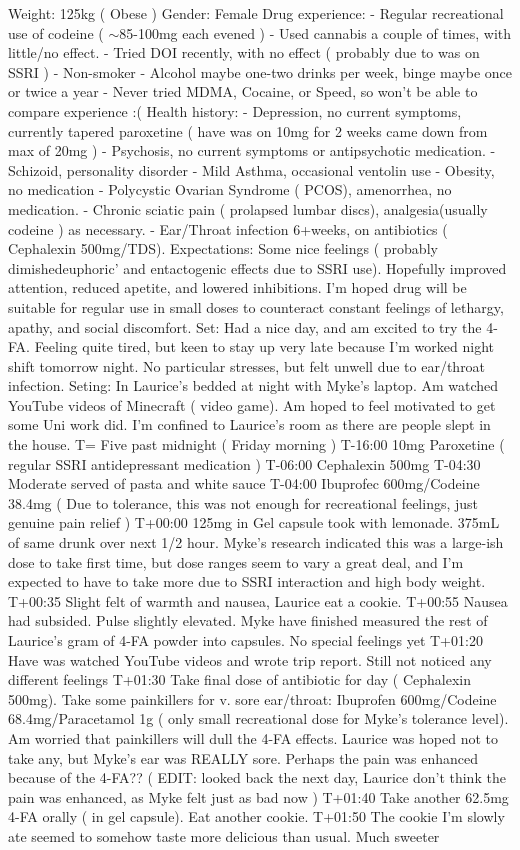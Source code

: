 \documentclass[12pt]{book}
\begin{document}
Weight: 125kg ( Obese ) Gender: Female Drug experience: - Regular recreational use of codeine ( $\sim$85-100mg each evened ) - Used cannabis a couple of times, with little/no effect. - Tried DOI recently, with no effect ( probably due to was on SSRI ) - Non-smoker - Alcohol maybe one-two drinks per week, binge maybe once or twice a year - Never tried MDMA, Cocaine, or Speed, so won't be able to compare experience :( Health history: - Depression, no current symptoms, currently tapered paroxetine ( have was on 10mg for 2 weeks came down from max of 20mg ) - Psychosis, no current symptoms or antipsychotic medication. - Schizoid, personality disorder - Mild Asthma, occasional ventolin use - Obesity, no medication - Polycystic Ovarian Syndrome ( PCOS), amenorrhea, no medication. - Chronic sciatic pain ( prolapsed lumbar discs), analgesia(usually codeine ) as necessary. - Ear/Throat infection 6+weeks, on antibiotics ( Cephalexin 500mg/TDS). Expectations: Some nice feelings ( probably dimishedeuphoric' and entactogenic effects due to SSRI use). Hopefully improved attention, reduced apetite, and lowered inhibitions. I'm hoped drug will be suitable for regular use in small doses to counteract constant feelings of lethargy, apathy, and social discomfort. Set: Had a nice day, and am excited to try the 4-FA. Feeling quite tired, but keen to stay up very late because I'm worked night shift tomorrow night. No particular stresses, but felt unwell due to ear/throat infection. Seting: In Laurice's bedded at night with Myke's laptop. Am watched YouTube videos of Minecraft ( video game). Am hoped to feel motivated to get some Uni work did. I'm confined to Laurice's room as there are people slept in the house. T= Five past midnight ( Friday morning ) T-16:00 10mg Paroxetine ( regular SSRI antidepressant medication ) T-06:00 Cephalexin 500mg T-04:30 Moderate served of pasta and white sauce T-04:00 Ibuprofec 600mg/Codeine 38.4mg ( Due to tolerance, this was not enough for recreational feelings, just genuine pain relief ) T+00:00 125mg in Gel capsule took with lemonade. 375mL of same drunk over next 1/2 hour. Myke's research indicated this was a large-ish dose to take first time, but dose ranges seem to vary a great deal, and I'm expected to have to take more due to SSRI interaction and high body weight. T+00:35 Slight felt of warmth and nausea, Laurice eat a cookie. T+00:55 Nausea had subsided. Pulse slightly elevated. Myke have finished measured the rest of Laurice's gram of 4-FA powder into capsules. No special feelings yet T+01:20 Have was watched YouTube videos and wrote trip report. Still not noticed any different feelings T+01:30 Take final dose of antibiotic for day ( Cephalexin 500mg). Take some painkillers for v. sore ear/throat: Ibuprofen 600mg/Codeine 68.4mg/Paracetamol 1g ( only small recreational dose for Myke's tolerance level). Am worried that painkillers will dull the 4-FA effects. Laurice was hoped not to take any, but Myke's ear was REALLY sore. Perhaps the pain was enhanced because of the 4-FA?? ( EDIT: looked back the next day, Laurice don't think the pain was enhanced, as Myke felt just as bad now ) T+01:40 Take another 62.5mg 4-FA orally ( in gel capsule). Eat another cookie. T+01:50 The cookie I'm slowly ate seemed to somehow taste more delicious than usual. Much sweeter 
\end{document}
